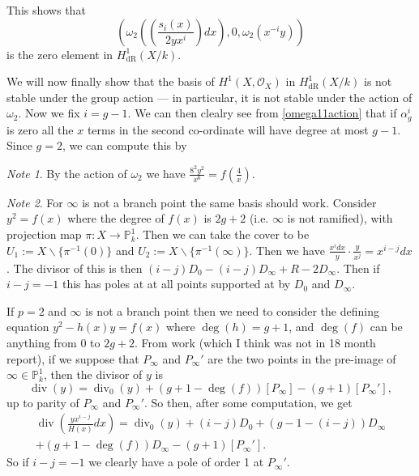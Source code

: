 \documentclass[draft, 11pt]{article} %
\theoremstyle{plain}
\theoremstyle{remark}
\newtheorem*{note}{Note}
\newcommand{\hone}{H^1(X,\mathcal{O}_X)}
\newcommand{\derhamhone}{H_{\text {dR}}^1(X/k)}
\DeclareMathOperator{\di}{div}
\begin{document}
This shows that
\[
\left( \omega_2 \left( \left( \frac{s_i(x)}{2yx^i} \right) dx \right) , 0, \omega_2( x^{-i}y)\right)
\]
is the zero element in $\derhamhone$.

We will now finally show that the basis of $\hone$ in $\derhamhone$ is not stable under the group action --- in particular, it is not stable under the action of $\omega_2$.
Now we fix $i = g-1$.
We can then clealry see from \eqref{omega11action} that if $\alpha_{g}^i$ is zero all the $x$ terms in the second co-ordinate will have degree at most $g-1$.
Since $g =2$, we can compute this by 
\begin{note}
By the action of $\omega_2$ we have $\frac{8^2y^2}{x^6} = f\left(\frac{4}{x} \right)$.
\end{note}

\begin{note}
For $\infty$ is not a branch point the same basis should work. 
Consider $y^2 = f(x)$ where the degree of $f(x)$ is $2g+2$ (i.e. $\infty$ is not ramified), with projection map $\pi : X \rightarrow \mathbb P_k^1$.
Then we can take the cover to be $U_1 := X \backslash \{\pi^{-1}(0)\}$ and $U_2 := X \backslash \{\pi^{-1}(\infty)\}$.
Then we have $\frac{x^idx}{y} \cdot \frac{y}{x^{j}} = x^{i-j}dx$.
The divisor of this is then $(i-j)D_0 -(i-j)D_\infty + R - 2D_\infty$.
Then if $i-j = -1$ this has poles at at all points supported at by $D_0$ and $D_\infty$.


If $p=2$ and $\infty$ is not a branch point then we need to consider the defining equation $y^2 - h(x)y = f(x)$ where $\deg(h)=g+1$, and $\deg(f)$ can be anything from 0 to $2g+2$.
From work (which I think was not in 18 month report), if we suppose that $P_\infty$ and $P_\infty'$ are the two points in the pre-image of $\infty \in \mathbb P_k^1$, then the divisor of $y$ is
\[
\di(y) = \di_0(y) +(g+1 - \deg(f))[P_\infty] - (g+1)[P_\infty'],
\]
up to parity of $P_\infty$ and $P_\infty'$.
So then, after some computation, we get
\begin{multline*}
\di\left(\frac{yx^{i-j}}{H(x)}dx \right) = \di_0(y) + (i-j)D_0 + (g-1-(i-j))D_\infty \\ + (g+1-\deg(f))D_\infty -(g+1)[P_\infty'].
\end{multline*}
So if $i-j = -1$ we clearly have a pole of order 1 at $P_\infty'$.
\end{note}
\end{document}
